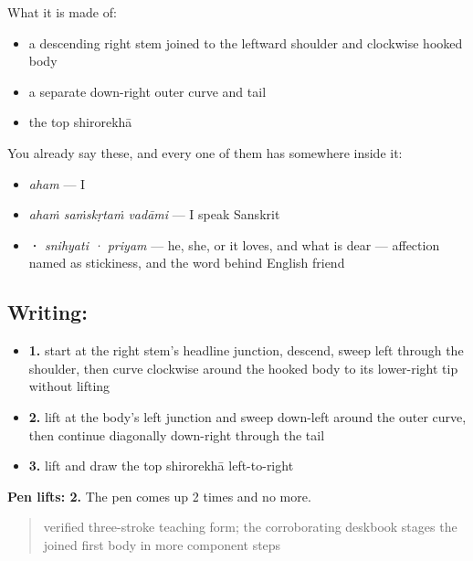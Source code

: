 What it is made of:

\begin{itemize}
\raggedright
  \item a descending right stem joined to the leftward shoulder and clockwise hooked body
  \item a separate down-right outer curve and tail
  \item the top shirorekhā
\end{itemize}

You already say these, and every one of them has  somewhere inside it:

\begin{itemize}
\raggedright
  \item \textbf{} \emph{aham} — I
  \item \textbf{  } \emph{ahaṁ saṁskṛtaṁ vadāmi} — I speak Sanskrit
  \item \textbf{ · } \emph{snihyati · priyam} — he, she, or it loves, and what is dear — affection named as stickiness, and the word behind English friend
\end{itemize}

\subsection*{Writing: }

\begin{itemize}
\raggedright
  \item \textbf{1.} start at the right stem's headline junction, descend, sweep left through the shoulder, then curve clockwise around the hooked body to its lower-right tip without lifting
  \item \textbf{2.} lift at the body's left junction and sweep down-left around the outer curve, then continue diagonally down-right through the tail
  \item \textbf{3.} lift and draw the top shirorekhā left-to-right
\end{itemize}

\textbf{Pen lifts: 2.} The pen comes up 2 times and no more.

\begin{quote}
verified three-stroke teaching form; the corroborating deskbook stages the joined first body in more component steps
\end{quote}

